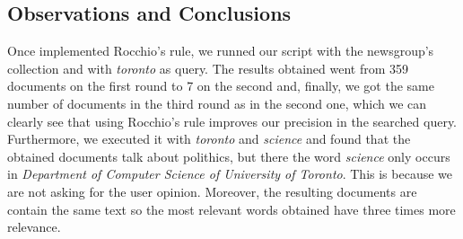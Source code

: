 \documentclass[11pt]{article}
\begin{document}
\subsection{Observations and Conclusions}
Once implemented Rocchio's rule, we runned our script with the newsgroup's collection and with \textit{toronto} as query. The results obtained went from 359 documents on the first round to 7 on the second and, finally, we got the same number of documents in the third round as in the second one, which we can clearly see that using Rocchio's rule improves our precision in the searched query.\\
Furthermore, we executed it with \textit{toronto} and \textit{science} and found that the obtained documents talk about polithics, but there the word \textit{science} only occurs in \textit{Department of Computer Science of University of Toronto}. This is because we are not asking for the user opinion. Moreover, the resulting documents are contain the same text so the most relevant words obtained have three times more relevance.
\end{document}
